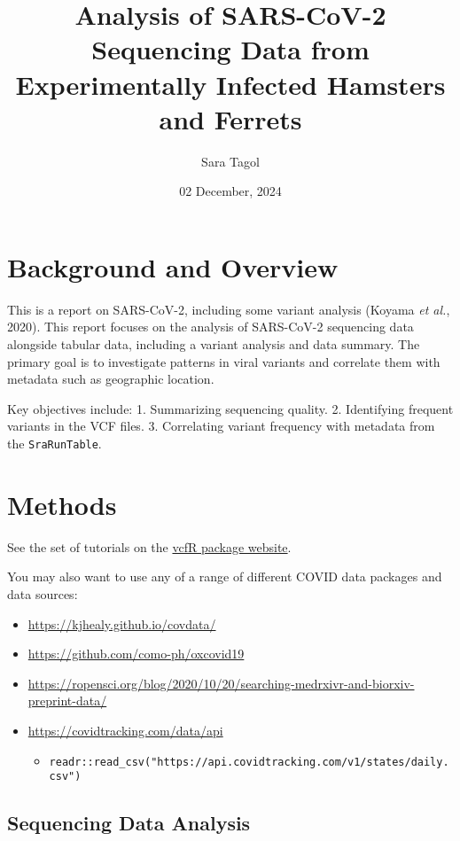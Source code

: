 \documentclass[
]{article}
\title{Analysis of SARS-CoV-2 Sequencing Data from Experimentally Infected
Hamsters and Ferrets}
\author{Sara Tagol}
\date{02 December, 2024}
\providecommand{\tightlist}{%
  \setlength{\itemsep}{0pt}\setlength{\parskip}{0pt}}
\begin{document}
\maketitle

\hypertarget{background-and-overview}{%
\section{Background and Overview}\label{background-and-overview}}

This is a report on SARS-CoV-2, including some variant analysis (Koyama
\emph{et al.}, 2020). This report focuses on the analysis of SARS-CoV-2
sequencing data alongside tabular data, including a variant analysis and
data summary. The primary goal is to investigate patterns in viral
variants and correlate them with metadata such as geographic location.

Key objectives include: 1. Summarizing sequencing quality. 2.
Identifying frequent variants in the VCF files. 3. Correlating variant
frequency with metadata from the \texttt{SraRunTable}.

\hypertarget{methods}{%
\section{Methods}\label{methods}}

See the set of tutorials on the
\href{https://knausb.github.io/vcfR_documentation/index.html}{vcfR
package website}.

You may also want to use any of a range of different COVID data packages
and data sources:

\begin{itemize}
\tightlist
\item
  \url{https://kjhealy.github.io/covdata/}
\item
  \url{https://github.com/como-ph/oxcovid19}
\item
  \url{https://ropensci.org/blog/2020/10/20/searching-medrxivr-and-biorxiv-preprint-data/}
\item
  \url{https://covidtracking.com/data/api}

  \begin{itemize}
  \tightlist
  \item
    \texttt{readr::read\_csv("https://api.covidtracking.com/v1/states/daily.csv")}
  \end{itemize}
\end{itemize}

\hypertarget{sequencing-data-analysis}{%
\subsection{Sequencing Data Analysis}\label{sequencing-data-analysis}}
\end{document}
